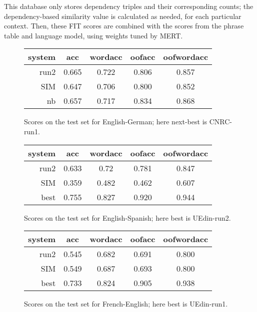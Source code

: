 \documentclass[11pt]{article}
\begin{document}
This database only stores dependency triples and their corresponding counts;
the dependency-based similarity value is calculated as needed, for each
particular context. Then, these FIT scores are combined with the scores from the
phrase table and language model, using weights tuned by MERT.

\begin{figure}[t]
  \begin{center}
  \begin{tabular}{|r|c|c|c|c|}
    \hline
    system & acc      & wordacc  & oofacc & oofwordacc \\
    \hline
    run2  &  0.665 & 0.722  &  0.806  & 0.857 \\
    SIM    &  0.647 & 0.706 & 0.800 & 0.852 \\
    nb     &  0.657   & 0.717   & 0.834 & 0.868    \\
    \hline
  \end{tabular}
  \end{center}
\caption{Scores on the test set for English-German; here next-best is CNRC-run1.}
\label{fig:theresults-en-de}
\end{figure}

\begin{figure}[t]
  \begin{center}
  \begin{tabular}{|r|c|c|c|c|}
    \hline
    system & acc      & wordacc  & oofacc & oofwordacc \\
    \hline
    run2  &  0.633 & 0.72 & 0.781 & 0.847 \\
    SIM    &  0.359 &  0.482 & 0.462 & 0.607 \\
    best   &  0.755 & 0.827   & 0.920  & 0.944 \\
    \hline
  \end{tabular}
  \end{center}
\caption{Scores on the test set for English-Spanish; here best is UEdin-run2.}
\label{fig:theresults-en-es}
\end{figure}

\begin{figure}[t]
  \begin{center}
  \begin{tabular}{|r|c|c|c|c|}
    \hline
    system & acc      & wordacc  & oofacc & oofwordacc \\
    \hline
    run2  & 0.545  & 0.682 & 0.691 & 0.800 \\
    SIM        &  0.549 & 0.687 & 0.693 & 0.800 \\
    best & 0.733 & 0.824 & 0.905 & 0.938 \\
    \hline
  \end{tabular}
  \end{center}
\caption{Scores on the test set for French-English; here best is UEdin-run1.}
\label{fig:theresults-fr-en}
\end{figure}
\end{document}
